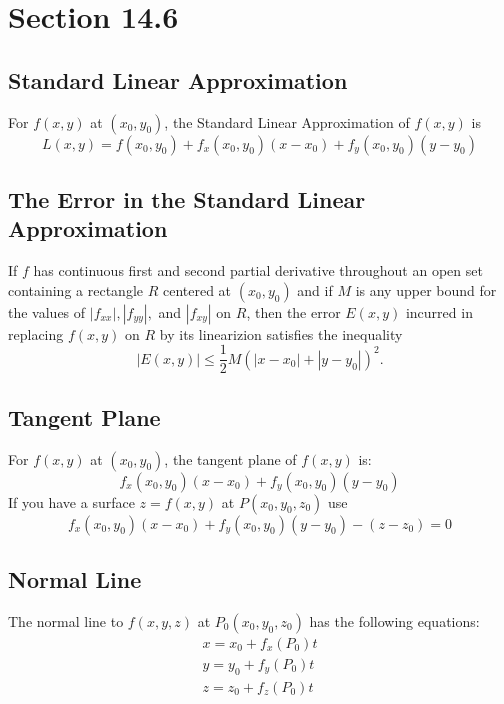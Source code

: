 \documentclass[../main.tex]{subfiles}
\begin{document}
\section{Section 14.6}

\subsection{Standard Linear Approximation}
For $f(x,y)$ at $(x_0, y_0)$, the Standard Linear Approximation of $f(x,y)$ is 
\begin{equation} 
L(x,y) = f(x_0,y_0) + f_x(x_0,y_0)(x-x_0) + f_y(x_0,y_0)(y-y_0) 
\end{equation}

\subsection{The Error in the Standard Linear Approximation}
If $f$ has continuous first and second partial derivative throughout an open set containing a 
rectangle $R$ centered at $(x_0, y_0)$ and if $M$ is any upper bound for the values of $|f_{xx}|,
|f_{yy}|,$ and $|f_{xy}|$ on $R$, then the error $E(x,y)$ incurred in replacing $f(x,y)$ on $R$ by
its linearizion satisfies the inequality
\begin{equation}
|E(x,y)| \leq \frac12 M(|x-x_0| + |y-y_0|)^2 .
\end{equation}

\subsection{Tangent Plane}
For $f(x,y)$ at $(x_0, y_0)$, the tangent plane of $f(x,y)$ is:
\begin{equation} 
f_x(x_0,y_0)(x-x_0) + f_y(x_0,y_0)(y-y_0) 
\end{equation}
If you have a surface $z = f(x,y)$ at $P(x_0,y_0,z_0)$ use 
\begin{equation}
f_x(x_0,y_0)(x-x_0) + f_y(x_0,y_0)(y-y_0) - (z-z_0) = 0
\end{equation}

\subsection{Normal Line}
The normal line to $f(x,y,z)$ at $P_0 (x_0,y_0,z_0)$ has the following equations:
\begin{align*}
x = x_0 + f_x(P_0)t \\
y = y_0 + f_y(P_0)t \\
z = z_0 + f_z(P_0)t \\
\end{align*}
\end{document}
